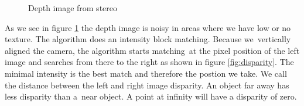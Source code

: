 \documentclass[11pt,a4paper,titlepage,oneside]{report}
\begin{document}
\begin{figure}[H]
	\centering
	\caption{Depth image from stereo}\label{fig:depth}
\end{figure}

As we see in figure \ref{fig:depth} the depth image is noisy in areas where we have low or no texture. The algorithm does an intensity block matching. Because we vertically aligned the camera, the algorithm starts matching at the pixel position of the left image and searches from there to the right as shown in figure \ref{fig:disparity}. The minimal intensity is the best match and therefore the postion we take. We call the distance between the left and right image disparity. An object far away has less disparity than a near object. A point at infinity will have a disparity of zero.
\end{document}

